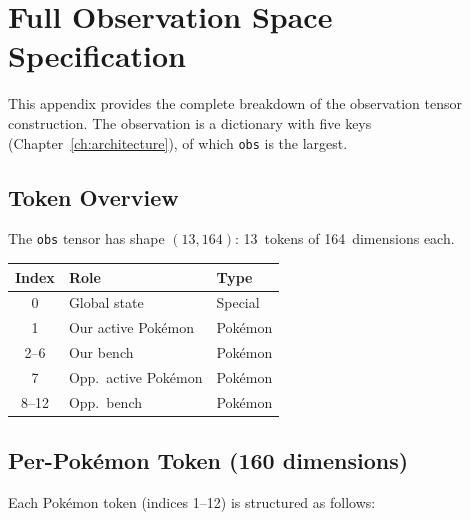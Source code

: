 \chapter{Full Observation Space Specification}
\label{ch:appendix_obs}

This appendix provides the complete breakdown of the observation tensor
construction.  The observation is a dictionary with five keys
(Chapter~\ref{ch:architecture}), of which \texttt{obs} is the largest.

\section{Token Overview}

The \texttt{obs} tensor has shape $(13, 164)$: 13~tokens of 164~dimensions
each.

\begin{center}
\small
\begin{tabularx}{0.6\textwidth}{c l l}
  \toprule
  \textbf{Index} & \textbf{Role} & \textbf{Type} \\
  \midrule
  0        & Global state        & Special \\
  1        & Our active Pok\'{e}mon  & Pok\'{e}mon \\
  2--6     & Our bench            & Pok\'{e}mon \\
  7        & Opp.\ active Pok\'{e}mon & Pok\'{e}mon \\
  8--12    & Opp.\ bench          & Pok\'{e}mon \\
  \bottomrule
\end{tabularx}
\end{center}

\section{Per-Pok\'{e}mon Token (160 dimensions)}

Each Pok\'{e}mon token (indices 1--12) is structured as follows:


